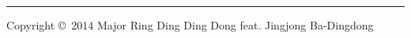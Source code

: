 \documentclass[10pt,landscape]{article}
\begin{document}
\raggedright
\footnotesize
\begin{multicols}{3}


\setlength{\premulticols}{1pt}
\setlength{\postmulticols}{1pt}
\setlength{\multicolsep}{1pt}
\setlength{\columnsep}{2pt}




\rule{0.3\linewidth}{0.25pt}
\scriptsize

Copyright \copyright\ 2014 Major Ring Ding Ding Dong feat. Jingjong Ba-Dingdong

\clearpage

\end{multicols}
\end{document}
